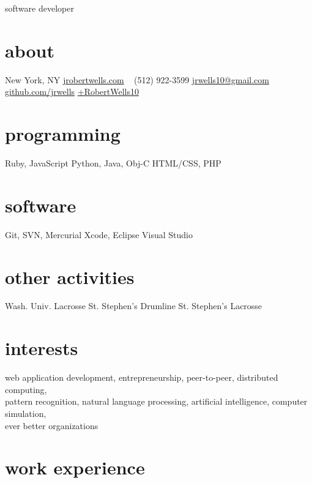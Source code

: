 \documentclass[]{cv}
\begin{document}
       {software developer}

\begin{aside}
  \section{about}
    {New York, NY}
    \href{http://jrobertwells.com}{jrobertwells.com}
    ~
    (512) 922-3599
    \href{mailto:jrwells10@gmail.com}{jrwells10@gmail.com}
    \href{http://github.com/jrwells}{github.com/jrwells}
    \href{http://google.com/+RobertWells10}{+RobertWells10}
  \section{programming}
    Ruby, JavaScript
    Python, Java, Obj-C
    HTML/CSS, PHP
  \section{software}
    Git, SVN, Mercurial
    Xcode, Eclipse
    Visual Studio
  \section{other activities}
    Wash. Univ. Lacrosse
    St. Stephen's Drumline
    St. Stephen's Lacrosse
\end{aside}

\section{interests}

web application development, entrepreneurship, peer-to-peer, distributed computing, \\
pattern recognition, natural language processing, artificial intelligence, computer simulation, \\
ever better organizations

\section{work experience}
\end{document}
